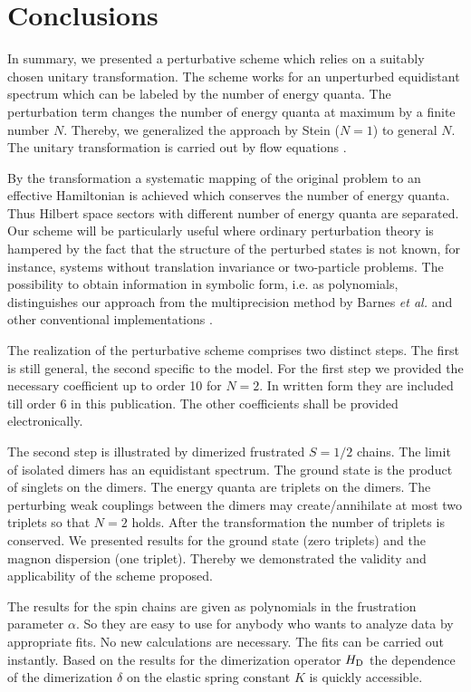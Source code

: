 \section{Conclusions}
In summary, we presented a perturbative scheme which relies on 
a suitably chosen unitary transformation.
 The scheme works for an unperturbed equidistant spectrum which can be 
labeled by the number of energy quanta. The perturbation term changes the
number of energy quanta at maximum by a finite number $N$.
Thereby, we generalized the approach by Stein ($N=1$) \cite{stein97}
to general $N$. The unitary transformation
is carried out by flow equations \cite{wegne94}.

By the transformation a systematic mapping of the original problem to
 an effective Hamiltonian is achieved which conserves the number of
energy quanta. Thus Hilbert space sectors with different number of 
energy quanta are separated. Our scheme will be particularly 
useful where ordinary perturbation
theory is hampered by the fact that the structure of the perturbed
states is not known, for instance, systems without translation invariance or
two-particle problems. The possibility to obtain information
in symbolic form, i.e. as polynomials, distinguishes our approach
from the multiprecision method by Barnes {\it et al.} \cite{barne98}
and other  conventional implementations \cite{gelfa90}.

The realization of the perturbative scheme comprises two distinct
steps. The first is still general, the second specific to the model.
For the first step we provided the necessary coefficient up to
order 10 for $N=2$. In written form they are included till order 6
in this publication. The other coefficients shall be provided 
electronically.

The second step is illustrated by dimerized frustrated $S=1/2$ chains.
The limit of isolated dimers has an equidistant spectrum. The ground
state is the product of singlets on the dimers.
The energy quanta are triplets on the dimers. The perturbing weak
couplings between the dimers may create/annihilate at most two triplets
so that $N=2$ holds. After the transformation the number of triplets
is conserved. We presented results for the ground state (zero triplets)
and the magnon dispersion (one triplet). Thereby we demonstrated the
validity and applicability of the scheme proposed.

The results for the spin chains are given as polynomials in the
frustration parameter $\alpha$. So they are easy to use for anybody
who wants to analyze data by appropriate fits. No new calculations
are necessary. The fits can be carried out instantly. Based on 
the results for the dimerization operator $H_{\rm D}$ the 
dependence of the dimerization $\delta$ on the elastic spring constant
$K$ is quickly accessible.

